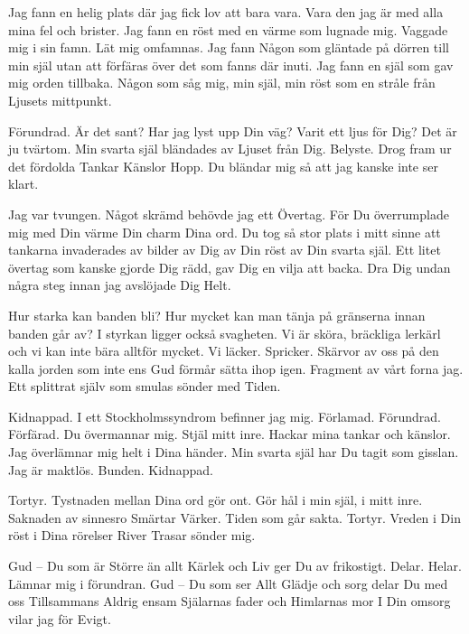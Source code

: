 \startpoem
Jag fann en helig plats
där jag fick lov att bara vara.
Vara den jag är med alla mina fel och
brister.
Jag fann en röst med en värme som
lugnade mig.
Vaggade mig i sin famn.
Lät mig omfamnas.
Jag fann Någon som gläntade på dörren
till min själ
utan att förfäras över det som fanns där inuti.
Jag fann en själ
som gav mig orden tillbaka.
Någon som såg mig, min själ, min röst
som en stråle från
Ljusets mittpunkt. 
\stoppoem

\startpoem
Förundrad. Är det sant?
Har jag lyst upp Din väg?
Varit ett ljus för Dig?
Det är ju tvärtom.
Min svarta själ bländades av
Ljuset från Dig.
Belyste. 
Drog fram ur det fördolda
Tankar
Känslor
Hopp.
Du bländar mig 
så att jag kanske inte 
ser klart.
\stoppoem

\startpoem
Jag var tvungen.
Något skrämd behövde jag ett 
Övertag.
För Du överrumplade mig med Din värme
Din charm
Dina ord.
Du tog så stor plats i mitt sinne att
tankarna invaderades av bilder av Dig
av Din röst
av Din svarta själ.
Ett litet övertag som kanske gjorde Dig rädd,
gav Dig en vilja att backa.
Dra Dig undan några steg
innan jag avslöjade Dig
Helt.
\stoppoem

\startpoem
Hur starka kan banden bli?
Hur mycket kan man tänja på gränserna
innan banden går av?
I styrkan ligger också svagheten.
Vi är sköra, bräckliga lerkärl och vi kan inte
bära alltför mycket.
Vi läcker. Spricker.
Skärvor av oss på den kalla jorden
som inte ens Gud förmår sätta ihop igen.
Fragment av vårt forna jag.
Ett splittrat själv som smulas sönder
med Tiden. 
\stoppoem

\startpoem
Kidnappad.
I ett Stockholmssyndrom befinner jag mig.
Förlamad.
Förundrad. 
Förfärad.
Du övermannar mig.
Stjäl mitt inre.
Hackar mina tankar och känslor.
Jag överlämnar mig helt i Dina händer.
Min svarta själ har Du tagit som gisslan.
Jag är maktlös.
Bunden.
Kidnappad. 
\stoppoem

\startpoem
Tortyr.
Tystnaden mellan Dina ord gör ont.
Gör hål i min själ, i mitt inre.
Saknaden av sinnesro 
Smärtar
Värker.
Tiden som går sakta.
Tortyr.
Vreden i Din röst
i Dina rörelser
River
Trasar sönder mig.
\stoppoem

\startpoem
Gud – Du som är 
Större än allt
Kärlek och Liv
ger Du av frikostigt.
Delar. 
Helar.
Lämnar mig i förundran.
Gud – Du som ser 
Allt
Glädje och sorg
delar Du med oss
Tillsammans
Aldrig ensam
Själarnas fader och
Himlarnas mor
I Din omsorg vilar jag för
Evigt.
\stoppoem

